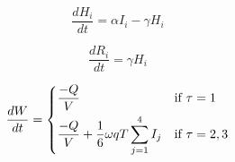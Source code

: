 \documentclass[fleqn]{article}
\begin{document}
\begin{equation}
\dfrac{dH_i}{dt} = \alpha I_i - \gamma H_i
\end{equation}

\begin{equation}
\dfrac{dR_i}{dt} = \gamma H_i
\end{equation}

\begin{equation}
\dfrac{dW}{dt} = 
\begin{dcases}
\dfrac{-Q}{V} & \text{if $\tau = 1$} \\
\dfrac{-Q}{V} + \dfrac{1}{6} \omega q T \sum_{j=1}^4 I_j & \text{if $\tau = 2, 3$}
\end{dcases}
\end{equation}

\newpage
\end{document}
